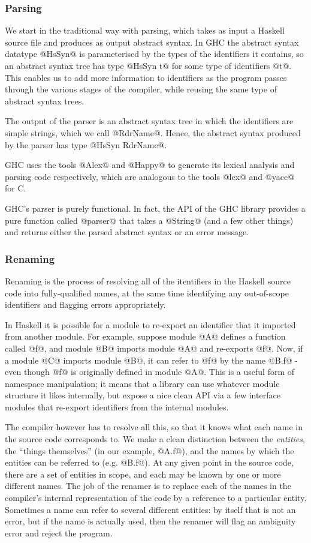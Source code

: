 \documentclass{article}
\begin{document}
\subsubsection{Parsing}

We start in the traditional way with parsing, which takes as input a
Haskell source file and produces as output abstract syntax.  In GHC
the abstract syntax datatype @HsSyn@ is parameterised by the types of
the identifiers it contains, so an abstract syntax tree has type
@HsSyn t@ for some type of identifiers @t@.  This enables us to add
more information to identifiers as the program passes through the
various stages of the compiler, while reusing the same type of
abstract syntax trees.

The output of the parser is an abstract syntax tree in which the
identifiers are simple strings, which we call @RdrName@.  Hence, the
abstract syntax produced by the parser has type @HsSyn RdrName@.

GHC uses the tools @Alex@ and @Happy@ to generate its lexical analysis
and parsing code respectively, which are analogous to the tools @lex@
and @yacc@ for C.

GHC's parser is purely functional.  In fact, the API of the GHC
library provides a pure function called @parser@ that takes a @String@
(and a few other things) and returns either the parsed abstract syntax or an
error message.

\subsubsection{Renaming}

Renaming is the process of resolving all of the itentifiers in the
Haskell source code into fully-qualified names, at the same time
identifying any out-of-scope identifiers and flagging errors
appropriately.

In Haskell it is possible for a module to re-export an identifier that
it imported from another module.  For example, suppose module @A@
defines a function called @f@, and module @B@ imports module @A@ and
re-exports @f@.  Now, if a module @C@ imports module @B@, it can refer
to @f@ by the name @B.f@ - even though @f@ is originally defined in
module @A@.  This is a useful form of namespace manipulation; it means
that a library can use whatever module structure it likes internally,
but expose a nice clean API via a few interface modules that re-export
identifiers from the internal modules.

The compiler however has to resolve all this, so that it knows what
each name in the source code corresponds to.  We make a clean
distinction between the \emph{entities}, the ``things themselves'' (in
our example, @A.f@), and the names by which the entities can be
referred to (e.g. @B.f@).  At any given point in the source code,
there are a set of entities in scope, and each may be known by one or
more different names.  The job of the renamer is to replace each of
the names in the compiler's internal representation of the code by a
reference to a particular entity.  Sometimes a name can refer to
several different entities: by itself that is not an error, but if the
name is actually used, then the renamer will flag an ambiguity error
and reject the program.
\end{document}
